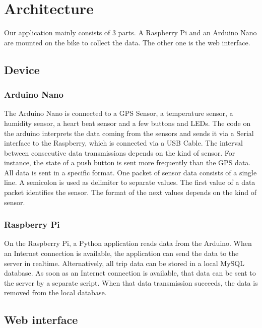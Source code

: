 \section{Architecture}
Our application mainly consists of 3 parts. 
A Raspberry Pi and an Arduino Nano are mounted on the bike to collect the data. 
The other one is the web interface.
\subsection{Device}
\subsubsection{Arduino Nano}
The Arduino Nano is connected to a GPS Sensor, a temperature sensor, a humidity sensor, a heart beat sensor and a few buttons and LEDs. 
The code on the arduino interprets the data coming from the sensors and sends it via a Serial interface to the Raspberry, which is connected via a USB Cable.
The interval between consecutive data transmissions depends on the kind of sensor. 
For instance, the state of a push button is sent more frequently than the GPS data.
All data is sent in a specific format. One packet of sensor data consists of a single line.
A semicolon is used as delimiter to separate values. The first value of a data packet identifies the sensor. 
The format of the next values depends on the kind of sensor.
\subsubsection{Raspberry Pi}
On the Raspberry Pi, a Python application reads data from the Arduino. 
When an Internet connection is available, the application can send the data to the server in realtime.
Alternatively, all trip data can be stored in a local MySQL database. 
As soon as an Internet connection is available, that data can be sent to the server by a separate script.
When that data transmission succeeds, the data is removed from the local database.
\subsection{Web interface}

